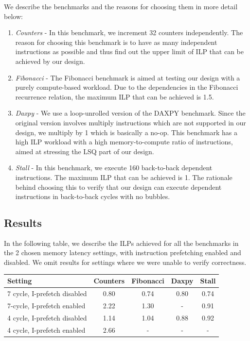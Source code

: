 \documentclass{article}
\begin{document}
We describe the benchmarks and the reasons for choosing them in more detail below:
\begin{enumerate}
	\item \textit{Counters} - In this benchmark, we increment 32 counters
	independently. The reason for choosing this benchmark is to have as
	many independent instructions as possible and thus find out the upper
	limit of ILP that can be achieved by our design.

	\item \textit{Fibonacci} - The Fibonacci benchmark is aimed at testing
	our design with a purely compute-based workload. Due to the
	dependencies in the Fibonacci recurrence relation, the maximum ILP that
	can be achieved is 1.5.

	\item \textit{Daxpy} - We use a loop-unrolled version of the DAXPY
	benchmark. Since the original version involves multiply instructions
	which are not supported in our design, we multiply by 1 which is
	basically a no-op. This benchmark has a high ILP workload with a high
	memory-to-compute ratio of instructions, aimed at stressing the LSQ
	part of our design.

	\item \textit{Stall} - In this benchmark, we execute 160 back-to-back
	dependent instructions. The maximum ILP that can be achieved is 1. The
	rationale behind choosing this to verify that our design can execute
	dependent instructions in back-to-back cycles with no bubbles.
\end{enumerate}

\subsection{Results}
\label{sub:results}

In the following table, we describe the ILPs achieved for all the benchmarks in
the 2 chosen memory latency settings, with instruction prefetching enabled and
disabled. We omit results for settings where we were unable to verify
correctness.

\begin{center}
    \begin{tabular}{|l|c|c|c|c|}
    \hline
    Setting & Counters & Fibonacci & Daxpy & Stall \\ \hline
    7 cycle, I-prefetch disabled & 0.80 & 0.74 & 0.80 & 0.74 \\ \hline
    7-cycle, I-prefetch enabled & 2.22 & 1.30 & - & 0.91 \\ \hline
    4 cycle, I-prefetch disabled & 1.14 & 1.04 & 0.88 & 0.92 \\ \hline
    4 cycle, I-prefetch enabled & 2.66 & - & - & - \\
    \hline
    \end{tabular}
\end{center}
\end{document}
